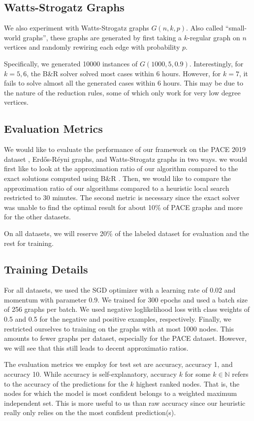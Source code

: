 \documentclass{article}
\newcommand{\N}{\mathbb{N}}
\begin{document}
\subsection{Watts-Strogatz Graphs}
We also experiment with Watts-Strogatz graphs $G(n, k, p)$.
Also called ``small-world graphs'',
these graphs are generated by first taking a $k$-regular graph on $n$ vertices
and randomly rewiring each edge with probability $p$.

Specifically,
we generated 10000 instances of $G(1000, 5, 0.9)$.
Interestingly, for $k=5,6$,
the B\&R solver solved most cases within 6 hours.
However, for $k=7$, it fails to solve almost all the generated cases within 6 hours.
This may be due to the nature of the reduction rules,
some of which only work for very low degree vertices.

\subsection{Evaluation Metrics}
We would like to evaluate the performance of our framework on the PACE 2019 dataset \citet{pace2019},
Erd\H os-R\'eyni graphs,
and Watts-Strogatz graphs in two ways.
we would first like to look at the approximation ratio of our algorithm compared to the exact solutions
computed using B\&R \citet{kamis}.
Then, we would like to compare the approximation ratio of our algorithms compared to a heuristic local search
restricted to 30 minutes.
The second metric is necessary since the exact solver was unable to find the optimal result for about 10\% of PACE graphs
and more for the other datasets.

On all datasets,
we will reserve 20\% of the labeled dataset for evaluation
and the rest for training.

\subsection{Training Details}
For all datasets,
we used the SGD optimizer with a learning rate of 0.02 and momentum with parameter 0.9.
We trained for 300 epochs
and used a batch size of 256 graphs per batch.
We used negative loglikelihood loss
with class weights of 0.5 and 0.5 for the negative and positive examples,
respectively.
Finally,
we restricted ourselves to training on the graphs with at most 1000 nodes.
This amounts to fewer graphs per dataset,
especially for the PACE dataset.
However,
we will see that this still leads to decent approximatio ratios.

The evaluation metrics we employ for test set are accuracy,
accuracy 1,
and accuracy 10.
While accuracy is self-explanatory,
accuracy $k$ for some $k\in \N$ refers to the accuracy of the predictions for the $k$ highest ranked nodes.
That is,
the nodes for which the model is most confident belongs to a weighted maximum independent set.
This is more useful to us than raw accuracy
since our heuristic really only relies on the the most confident prediction(s).
\end{document}
